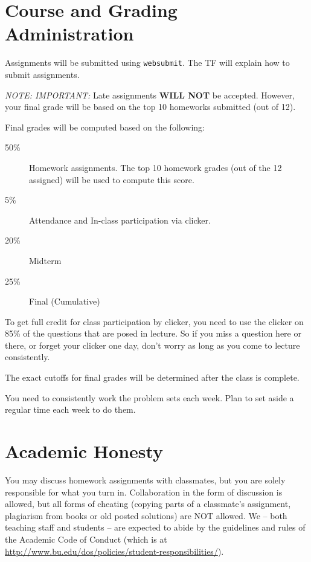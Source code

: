 \documentclass[11pt]{article}
\begin{document}
\section*{Course and Grading Administration}

Assignments will be submitted using \texttt{websubmit}.   The TF will
explain how to submit assignments.  

\emph{NOTE: IMPORTANT:} Late assignments \textbf{WILL NOT} be accepted.   However, your final
grade will be based on the top 10 homeworks submitted (out of 12).   

Final grades will be computed based on the following:
\begin{description}
\item[50\%] Homework assignments.  The top 10 homework grades (out of the
  12 assigned) will be used to compute this score.
\item[5\%] Attendance and In-class participation via clicker.
\item[20\%] Midterm
\item[25\%] Final (Cumulative)
\end{description}

To get full credit for class participation by clicker, you need to use
the clicker on 85\% of the questions that are posed in lecture.   So if
you miss a question here or there, or forget your clicker one day, don't
worry as long as you come to lecture consistently.

The exact cutoffs for final grades will be determined after the class is
complete.

You need to consistently work the problem sets each week.   Plan
  to set aside a regular time each week to do them.

\newpage

\section*{Academic Honesty}

You may discuss homework assignments with classmates, but you are 
solely responsible for what you turn in. Collaboration in the form of
discussion is allowed, but all forms of cheating (copying parts of a
classmate's assignment, plagiarism from books or old posted solutions)
are NOT allowed. We -- both teaching staff and students -- are expected
to abide by the guidelines and rules of the Academic Code of Conduct
(which is at
\url{http://www.bu.edu/dos/policies/student-responsibilities/}).
\end{document}
